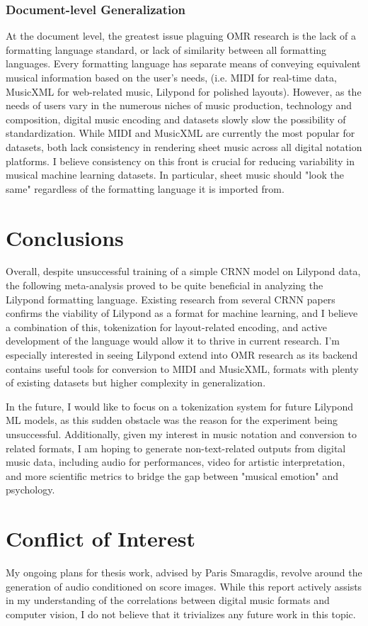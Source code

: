 \documentclass[nonacm, sigconf]{acmart}
\begin{document}
\subsubsection{Document-level Generalization}
At the document level, the greatest issue plaguing OMR research is the lack of a formatting language standard, or lack of similarity between all formatting languages.
Every formatting language has separate means of conveying equivalent musical information based on the user's needs, (i.e. MIDI for real-time data, MusicXML for web-related music, Lilypond for polished layouts).
However, as the needs of users vary in the numerous niches of music production, technology and composition, digital music encoding and datasets slowly slow the possibility of standardization.
While MIDI and MusicXML are currently the most popular for datasets, both lack consistency in rendering sheet music across all digital notation platforms.
I believe consistency on this front is crucial for reducing variability in musical machine learning datasets. In particular, sheet music should "look the same" regardless of the formatting language it is imported from. 

\section{Conclusions}
Overall, despite unsuccessful training of a simple CRNN model on Lilypond data, the following meta-analysis proved to be quite beneficial in analyzing the Lilypond formatting language.
Existing research from several CRNN papers confirms the viability of Lilypond as a format for machine learning, and I believe a combination of this, tokenization for layout-related encoding, 
and active development of the language would allow it to thrive in current research. 
I'm especially interested in seeing Lilypond extend into OMR research as its backend contains useful tools for conversion to MIDI and MusicXML, formats with plenty of existing datasets but higher complexity in generalization.

In the future, I would like to focus on a tokenization system for future Lilypond ML models, as this sudden obstacle was the reason for the experiment being unsuccessful.
Additionally, given my interest in music notation and conversion to related formats, I am hoping to generate non-text-related outputs from digital music data, including audio for performances,
video for artistic interpretation, and more scientific metrics to bridge the gap between "musical emotion" and psychology.

\section{Conflict of Interest}

My ongoing plans for thesis work, advised by Paris Smaragdis, revolve around the generation of audio conditioned on score images. 
While this report actively assists in my understanding of the correlations between digital music formats and computer vision, I do not believe that it trivializes any future work in this topic.



\end{document}
